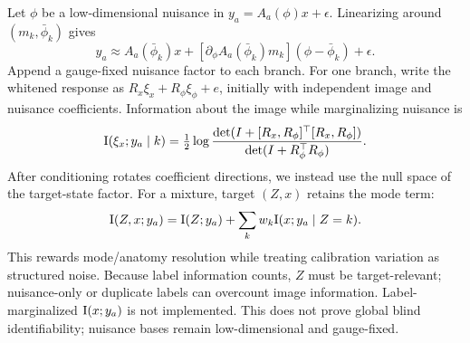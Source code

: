 Let $\phi$ be a low-dimensional nuisance in
$y_a=A_a(\phi)x+\epsilon$.  Linearizing around $(m_k,\bar\phi_k)$ gives
\begin{equation}
  y_a\approx A_a(\bar\phi_k)x+
  \left[\partial_\phi A_a(\bar\phi_k)m_k\right](\phi-\bar\phi_k)+\epsilon.
  \label{eq:nuisance-linearization}
\end{equation}
Append a gauge-fixed nuisance factor to each branch.  For one branch, write
the whitened response as
$R_x\xi_x+R_\phi\xi_\phi+e$, initially with independent image and nuisance
coefficients.  Information about the image while marginalizing nuisance is
\begin{equation}
 \mathrm{I}(\xi_x;y_a\mid k)
 =\tfrac12\log\frac{
   \det(I+[R_x,R_\phi]^\top[R_x,R_\phi])}{
   \det(I+R_\phi^\top R_\phi)}.
 \label{eq:target-info}
\end{equation}
After conditioning rotates coefficient directions, we instead use the null
space of the target-state factor.  For a mixture, target $(Z,x)$ retains the
mode term:
\begin{equation}
 \mathrm{I}(Z,x;y_a)
 =\mathrm{I}(Z;y_a)+\sum_kw_k\mathrm{I}(x;y_a\mid Z=k).
 \label{eq:mixture-target}
\end{equation}
This rewards mode/anatomy resolution while treating calibration variation as
structured noise.  Because label information counts, $Z$ must be
target-relevant; nuisance-only or duplicate labels can overcount image
information.  Label-marginalized $\mathrm{I}(x;y_a)$ is not implemented.  This does
not prove global blind identifiability; nuisance bases remain low-dimensional
and gauge-fixed.
